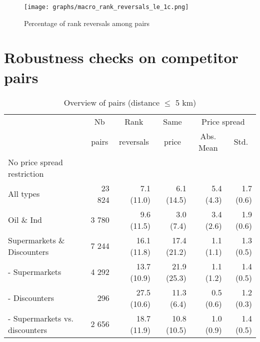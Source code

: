 \documentclass[english]{article}
\begin{document}
\begin{figure}[htb!]
    \caption{Percentage of rank reversals among pairs}
    \label{fig:pct_reversed_pairs}
	\centering
		\texttt{[image: graphs/macro\_rank\_reversals\_le\_1c.png]}
\end{figure}

\newpage

\section{Robustness checks on competitor pairs}

\begin{table}[htb!] %
\caption{Overview of pairs (distance $\le$ 5 km)}
\label{tab:stats_pairs_5km}
\begin{threeparttable}
\begin{tabular}{lrrrrr}
    \toprule
    \toprule
          & \multicolumn{1}{c}{Nb} & \multicolumn{1}{c}{Rank} & \multicolumn{1}{c}{Same} & \multicolumn{2}{c}{Price spread} \\
          & \multicolumn{1}{c}{pairs} & \multicolumn{1}{c}{reversals} & \multicolumn{1}{c}{price} & \multicolumn{1}{c}{Abs. Mean} & \multicolumn{1}{c}{Std.} \\
    \midrule
    No price spread restriction &       &       &       &       &  \\
    All types & 23 824 & 7.1 (11.0) & 6.1 (14.5) & 5.4 (4.3) & 1.7 (0.6) \\
    Oil \& Ind & 3 780 & 9.6 (11.5) & 3.0 (7.4) & 3.4 (2.6) & 1.9 (0.6) \\
    Supermarkets \& Discounters & 7 244 & 16.1 (11.8) & 17.4 (21.2) & 1.1 (1.1) & 1.3 (0.5) \\
    \hspace*{4mm} - Supermarkets & 4 292 & 13.7 (10.9) & 21.9 (25.3) & 1.1 (1.2) & 1.4 (0.5) \\
    \hspace*{4mm} - Discounters & 296   & 27.5 (10.6) & 11.3 \phantom{0}(6.4) & 0.5 (0.6) & 1.2 (0.3) \\
    \hspace*{4mm} - Supermarkets vs. discounters & 2 656 & 18.7 (11.9) & 10.8 (10.5) & 1.0 (0.9) & 1.4 (0.5) \\

\end{tabular}
\end{threeparttable}
\end{table}
\end{document}
